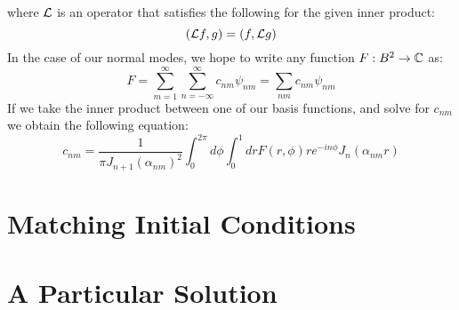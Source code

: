 \documentclass{article}
\begin{document}
where $\mathcal{L}$ is an operator that satisfies the following for the given inner product:
\begin{equation}
  (\mathcal{L} f,g) = (f,\mathcal{L} g)
\end{equation}
In the case of our normal modes, we hope to write any function $F:B^2\rightarrow\mathbb{C}$ as:
\begin{equation}
  \boxed{
    F = \sum_{m = 1}^\infty\sum_{n = -\infty}^\infty c_{nm} \psi_{nm} = \sum_{nm} c_{nm}\psi_{nm}
  }
\end{equation}
If we take the inner product between one of our basis functions, and solve for $c_{nm}$ we obtain the following equation:
\begin{equation}
  \boxed{
    c_{nm} = \frac{1}{\pi J_{n+1}(\alpha_{nm})^2}\int_0^{2\pi} d\phi\int_0^1 dr F(r,\phi) r e^{- i n \phi}J_n(\alpha_{nm} r)
  }
\end{equation}
\section{Matching Initial Conditions}
\section{A Particular Solution}

\newpage
\end{document}
